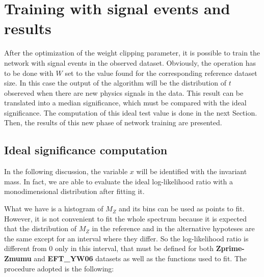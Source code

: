 \chapter{Training with signal events and results}
\label{chap:RESULTS}

After the optimization of the weight clipping parameter, it is possible to train the network with signal events in the observed dataset. Obviously, the operation has to be done with $W$ set to the value found for the corresponding reference dataset size. In this case the output of the algorithm will be the distribution of $t$ obsereved when there are new physics signals in the data. This result can be translated into a median significance, which must be compared with the ideal significance. The computation of this ideal test value is done in the next Section. Then, the results of this new phase of network training are presented.





\section{Ideal significance computation}
In the following discussion, the variable $x$ will be identified with the invariant mass. In fact, we are able to evaluate the ideal log-likelihood ratio with a monodimensional distribution after fitting it.

What we have is a histogram of $M_Z$ and its bins can be used as points to fit. However, it is not convenient to fit the whole spectrum because it is expected that the distribution of $M_{Z}$ in the reference and in the alternative hypoteses are the same except for an interval where they differ. So the log-likelihood ratio is different from 0 only in this interval, that must be defined for both \textbf{Zprime-Zmumu} and \textbf{EFT\_YW06} datasets as well as the functions used to fit. The procedure adopted is the following:


